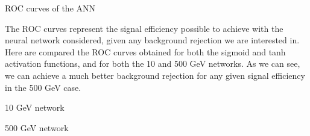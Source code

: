 \documentclass[handout,8 pt]{beamer}
\begin{document}
\begin{frame}{ROC curves of the ANN}

	\justifying
 The ROC curves represent the signal efficiency possible to achieve with the neural network considered, given any background rejection we are interested in. Here are compared the ROC curves obtained for both the sigmoid and tanh activation functions, and for both the 10 and 500 GeV networks. As we can see, we can achieve a much better background rejection for any given signal efficiency in the 500 GeV case. \vfill

   \begin{minipage}[c]{.48\linewidth}
       \begin{exampleblock}{} { \begin{center} 10 GeV network \end{center}} \end{exampleblock} \vspace{10pt}
   \end{minipage} \hfill
   \hspace{4pt}
   \begin{minipage}[c]{.48\linewidth}
   	\begin{exampleblock}{} {\begin{center} 500 GeV network \end{center}} \end{exampleblock} \vspace{10pt}
   \end{minipage} \hfill \vfill
	
\end{frame}
\end{document}
